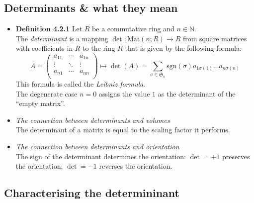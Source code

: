 \documentclass[11pt,a4paper]{article}
\begin{document}
\subsection{Determinants \& what they mean}

\begin{itemize}

    \item \textbf{Definition 4.2.1}
        Let $R$ be a commutative ring and $n \in \mathbb{N}$. \\
        The \emph{determinant} is a mapping
        $\det : \mathrm{Mat}(n;R) \to R$ from square matrices with coefficients in $R$
        to the ring $R$ that is given by the following formula:
        \[
            A =
            \begin{pmatrix}
                a_{11} & \cdots & a_{1n} \\
                \vdots & \ddots & \vdots \\
                a_{n1} & \cdots & a_{nn} \\
            \end{pmatrix}
            \mapsto \det (A) =
            \sum_{\sigma \in \mathfrak{S}_n}
            \mathrm{sgn}(\sigma) a_{1\sigma(1)} \ldots a_{n\sigma(n)}
        \]
        This formula is called the \emph{Leibniz formula}. \\
        The degenerate case $n=0$ assigns the value $1$ as the determinant of the ``empty matrix''.

    \item \emph{The connection between determinants and volumes} \\
        The determinant of a matrix is equal to the scaling factor it performs.

    \item \emph{The connection between determinants and orientation} \\
        The sign of the determinant determines the orientation:
        $\det = +1$ preserves the orientation;
        $\det = -1$ reverses the orientation.

\end{itemize}

\subsection{Characterising the determininant}
\end{document}
